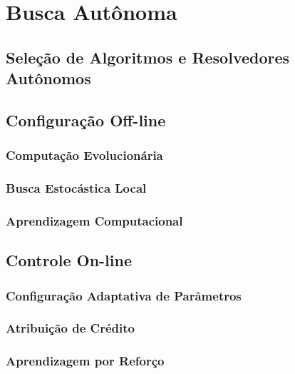 \chapter{Busca Autônoma}
\label{chap:autonomous}

\section{Seleção de Algoritmos e Resolvedores Autônomos}
\label{sec:algselres}

\section[Configuração \emph{Off-line}]{Configuração Off-line}
\label{sec:offconfig}

\subsection{Computação Evolucionária}
\label{subsec:evolcomp}

\subsection{Busca Estocástica Local}
\label{subsec:searchsls}

\subsection{Aprendizagem Computacional}
\label{subsec:searchml}

\section[Controle \emph{On-line}]{Controle On-line}
\label{sec:oncontrol}

\subsection{Configuração Adaptativa de Parâmetros}
\label{subsec:paramadaptive}

\subsection{Atribuição de Crédito}
\label{subsec:creditassign}

\subsection{Aprendizagem por Reforço}
\label{subsec:reinforce}
